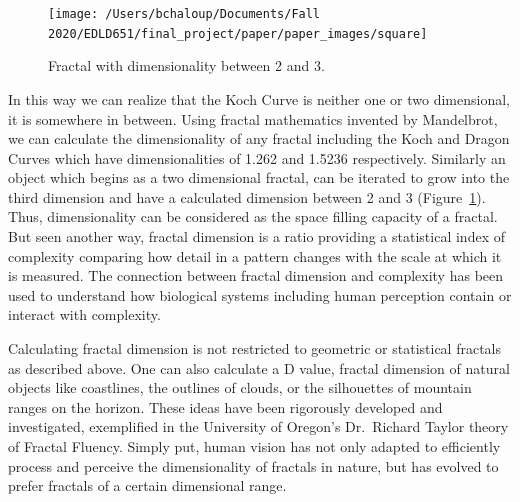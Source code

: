 \documentclass[english,jou]{apa6}
\begin{document}
\begin{figure}

{\centering \texttt{[image: /Users/bchaloup/Documents/Fall 2020/EDLD651/final\_project/paper/paper\_images/square]} 

}

\caption{Fractal with dimensionality between 2 and 3.}\label{fig:cube}
\end{figure}

In this way we can realize that the Koch Curve is neither one or two dimensional, it is somewhere in between. Using fractal mathematics invented by Mandelbrot, we can calculate the dimensionality of any fractal including the Koch and Dragon Curves which have dimensionalities of 1.262 and 1.5236 respectively. Similarly an object which begins as a two dimensional fractal, can be iterated to grow into the third dimension and have a calculated dimension between 2 and 3 (Figure~\ref{fig:cube}). Thus, dimensionality can be considered as the space filling capacity of a fractal. But seen another way, fractal dimension is a ratio providing a statistical index of complexity comparing how detail in a pattern changes with the scale at which it is measured. The connection between fractal dimension and complexity has been used to understand how biological systems including human perception contain or interact with complexity.

Calculating fractal dimension is not restricted to geometric or statistical fractals as described above. One can also calculate a D value, fractal dimension of natural objects like coastlines, the outlines of clouds, or the silhouettes of mountain ranges on the horizon. These ideas have been rigorously developed and investigated, exemplified in the University of Oregon's Dr.~Richard Taylor theory of Fractal Fluency. Simply put, human vision has not only adapted to efficiently process and perceive the dimensionality of fractals in nature, but has evolved to prefer fractals of a certain dimensional range.
\end{document}
